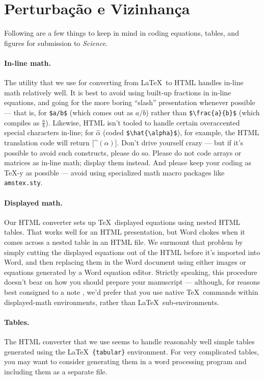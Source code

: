 \documentclass[12pt]{article}
\begin{document}
\section*{Perturbação e Vizinhança}

Following are a few things to keep in mind in coding equations,
tables, and figures for submission to {\it Science}.

\paragraph*{In-line math.}  The utility that we use for converting
from \LaTeX\ to HTML handles in-line math relatively well.  It is best
to avoid using built-up fractions in in-line equations, and going for
the more boring ``slash'' presentation whenever possible --- that is,
for \verb+$a/b$+ (which comes out as $a/b$) rather than
\verb+$\frac{a}{b}$+ (which compiles as $\frac{a}{b}$).  Likewise,
HTML isn't tooled to handle certain overaccented special characters
in-line; for $\hat{\alpha}$ (coded \verb+$\hat{\alpha}$+), for
example, the HTML translation code will return [\^{}$(\alpha)$].
Don't drive yourself crazy --- but if it's possible to avoid such
constructs, please do so.  Please do not code arrays or matrices as
in-line math; display them instead.  And please keep your coding as
\TeX-y as possible --- avoid using specialized math macro packages
like \texttt{amstex.sty}.

\paragraph*{Displayed math.} Our HTML converter sets up \TeX\
displayed equations using nested HTML tables.  That works well for an
HTML presentation, but Word chokes when it comes across a nested
table in an HTML file.  We surmount that problem by simply cutting the
displayed equations out of the HTML before it's imported into Word,
and then replacing them in the Word document using either images or
equations generated by a Word equation editor.  Strictly speaking,
this procedure doesn't bear on how you should prepare your manuscript
--- although, for reasons best consigned to a note \cite{nattex}, we'd
prefer that you use native \TeX\ commands within displayed-math
environments, rather than \LaTeX\ sub-environments.

\paragraph*{Tables.}  The HTML converter that we use seems to handle
reasonably well simple tables generated using the \LaTeX\
\texttt{\{tabular\}} environment.  For very complicated tables, you
may want to consider generating them in a word processing program and
including them as a separate file.
\end{document}

